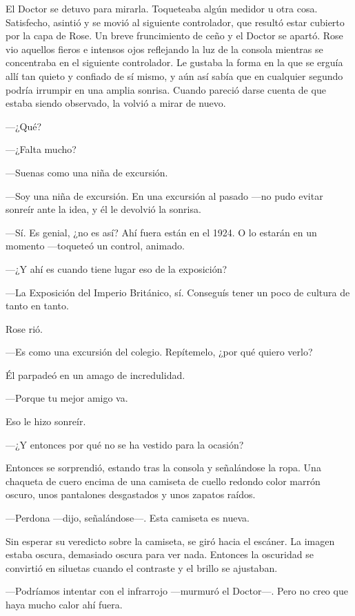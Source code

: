 {El Doctor se detuvo para mirarla. Toqueteaba algún medidor u otra cosa.
	Satisfecho, asintió y se movió al siguiente controlador, que resultó
	estar cubierto por la capa de Rose. Un breve fruncimiento de ceño y el
	Doctor se apartó. Rose vio aquellos fieros e intensos ojos reflejando la
	luz de la consola mientras se concentraba en el siguiente controlador.
	Le gustaba la forma en la que se erguía allí tan quieto y confiado de sí
	mismo, y aún así sabía que en cualquier segundo podría irrumpir en una
	amplia sonrisa. Cuando pareció darse cuenta de que estaba siendo
observado, la volvió a mirar de nuevo.}

{---¿Qué?}

{---¿Falta mucho?}

{---Suenas como una niña de excursión.}

{---Soy una niña de excursión. En una excursión al pasado ---no
pudo evitar sonreír ante la idea, y él le devolvió la sonrisa.}

{---Sí. Es genial, ¿no es así? Ahí fuera están en el 1924. O lo
estarán en un momento ---toqueteó un control, animado.}

{---¿Y ahí es cuando tiene lugar eso de la exposición?}

{---La Exposición del Imperio Británico, sí. Conseguís tener un poco
de cultura de tanto en tanto.}

{Rose rió.}

{---Es como una excursión del colegio. Repítemelo, ¿por qué quiero
verlo?}

{Él parpadeó en un amago de incredulidad.}

{---Porque tu mejor amigo va.}

{Eso le hizo sonreír.}

{---¿Y entonces por qué no se ha vestido para la ocasión?}

{Entonces se sorprendió, estando tras la consola y señalándose la ropa.
	Una chaqueta de cuero encima de una camiseta de cuello redondo color
marrón oscuro, unos pantalones desgastados y unos zapatos raídos.}

{---Perdona ---dijo, señalándose---. Esta camiseta es nueva.}

{Sin esperar su veredicto sobre la camiseta, se giró hacia el escáner.
	La imagen estaba oscura, demasiado oscura para ver nada. Entonces la
	oscuridad se convirtió en siluetas cuando el contraste y el brillo se
ajustaban.}

{---Podríamos intentar con el infrarrojo ---murmuró el
Doctor---. Pero no creo que haya mucho calor ahí fuera.}

